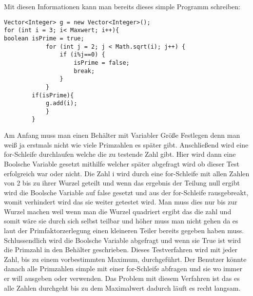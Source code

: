  Mit diesen Informationen kann man bereits dieses simple Programm schreiben: 
\lstset{language=Java} 
\begin{lstlisting}[frame=single] 
Vector<Integer> g = new Vector<Integer>();
for (int i = 3; i< Maxwert; i++){
boolean isPrime = true;
			for (int j = 2; j < Math.sqrt(i); j++) {
				if (i%j==0) {
					isPrime = false;
					break;
				}
			}
		if(isPrime){
			g.add(i);
			}	
		}
\end{lstlisting}
Am Anfang muss man einen Behälter mit Variabler Größe Festlegen denn man weiß ja erstmals nicht wie viele Primzahlen es später gibt. Anschließend wird eine for-Schleife durchlaufen welche die zu testende Zahl gibt. Hier wird dann eine Boolsche Variable gesetzt mithilfe welcher später abgefragt wird ob dieser Test erfolgreich war oder nicht. Die Zahl i wird durch eine for-Schleife mit allen Zahlen von 2 bis zu ihrer Wurzel geteilt und wenn das ergebnis der Teilung null ergibt wird die Boolsche Variable auf false gesetzt und aus der for-Schleife rausgebreakt, womit verhindert wird das sie weiter getestet wird. Man muss dies nur bis zur Wurzel machen weil wenn man die Wurzel quadriert ergibt das die zahl und somit wäre sie durch sich selbst teilbar und höher muss man nicht gehen da es laut der Primfaktorzerlegung einen kleineren Teiler bereits gegeben haben muss. Schlussendlich wird die Boolsche Variable abgefragt und wenn sie True ist wird die Primzahl in den Behälter geschrieben. Dieses Testverfahren wird mit jeder Zahl, bis zu einem vorbestimmten Maximum, durchgeführt. Der Benutzer könnte danach alle Primzahlen simple mit einer for-Schleife abfragen und sie wo immer er will ausgeben oder verwenden. Das Problem mit diesem Verfahren ist das es alle Zahlen durchgeht bis zu dem Maximalwert dadurch läuft es recht langsam.